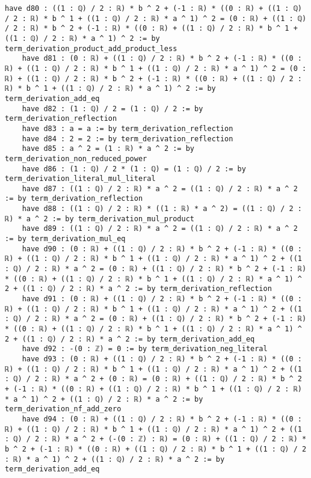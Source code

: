 \documentclass{article}
\begin{document}
\begin{tcolorbox}[colback=white!10, width=\linewidth]
\begin{lstlisting}[language=Lean4]
    have d80 : ((1 : ℚ) / 2 : ℝ) * b ^ 2 + (-1 : ℝ) * ((0 : ℝ) + ((1 : ℚ) / 2 : ℝ) * b ^ 1 + ((1 : ℚ) / 2 : ℝ) * a ^ 1) ^ 2 = (0 : ℝ) + ((1 : ℚ) / 2 : ℝ) * b ^ 2 + (-1 : ℝ) * ((0 : ℝ) + ((1 : ℚ) / 2 : ℝ) * b ^ 1 + ((1 : ℚ) / 2 : ℝ) * a ^ 1) ^ 2 := by term_derivation_product_add_product_less
    have d81 : (0 : ℝ) + ((1 : ℚ) / 2 : ℝ) * b ^ 2 + (-1 : ℝ) * ((0 : ℝ) + ((1 : ℚ) / 2 : ℝ) * b ^ 1 + ((1 : ℚ) / 2 : ℝ) * a ^ 1) ^ 2 = (0 : ℝ) + ((1 : ℚ) / 2 : ℝ) * b ^ 2 + (-1 : ℝ) * ((0 : ℝ) + ((1 : ℚ) / 2 : ℝ) * b ^ 1 + ((1 : ℚ) / 2 : ℝ) * a ^ 1) ^ 2 := by term_derivation_add_eq
    have d82 : (1 : ℚ) / 2 = (1 : ℚ) / 2 := by term_derivation_reflection
    have d83 : a = a := by term_derivation_reflection
    have d84 : 2 = 2 := by term_derivation_reflection
    have d85 : a ^ 2 = (1 : ℝ) * a ^ 2 := by term_derivation_non_reduced_power
    have d86 : (1 : ℚ) / 2 * (1 : ℚ) = (1 : ℚ) / 2 := by term_derivation_literal_mul_literal
    have d87 : ((1 : ℚ) / 2 : ℝ) * a ^ 2 = ((1 : ℚ) / 2 : ℝ) * a ^ 2 := by term_derivation_reflection
    have d88 : ((1 : ℚ) / 2 : ℝ) * ((1 : ℝ) * a ^ 2) = ((1 : ℚ) / 2 : ℝ) * a ^ 2 := by term_derivation_mul_product
    have d89 : ((1 : ℚ) / 2 : ℝ) * a ^ 2 = ((1 : ℚ) / 2 : ℝ) * a ^ 2 := by term_derivation_mul_eq
    have d90 : (0 : ℝ) + ((1 : ℚ) / 2 : ℝ) * b ^ 2 + (-1 : ℝ) * ((0 : ℝ) + ((1 : ℚ) / 2 : ℝ) * b ^ 1 + ((1 : ℚ) / 2 : ℝ) * a ^ 1) ^ 2 + ((1 : ℚ) / 2 : ℝ) * a ^ 2 = (0 : ℝ) + ((1 : ℚ) / 2 : ℝ) * b ^ 2 + (-1 : ℝ) * ((0 : ℝ) + ((1 : ℚ) / 2 : ℝ) * b ^ 1 + ((1 : ℚ) / 2 : ℝ) * a ^ 1) ^ 2 + ((1 : ℚ) / 2 : ℝ) * a ^ 2 := by term_derivation_reflection
    have d91 : (0 : ℝ) + ((1 : ℚ) / 2 : ℝ) * b ^ 2 + (-1 : ℝ) * ((0 : ℝ) + ((1 : ℚ) / 2 : ℝ) * b ^ 1 + ((1 : ℚ) / 2 : ℝ) * a ^ 1) ^ 2 + ((1 : ℚ) / 2 : ℝ) * a ^ 2 = (0 : ℝ) + ((1 : ℚ) / 2 : ℝ) * b ^ 2 + (-1 : ℝ) * ((0 : ℝ) + ((1 : ℚ) / 2 : ℝ) * b ^ 1 + ((1 : ℚ) / 2 : ℝ) * a ^ 1) ^ 2 + ((1 : ℚ) / 2 : ℝ) * a ^ 2 := by term_derivation_add_eq
    have d92 : -(0 : ℤ) = 0 := by term_derivation_neg_literal
    have d93 : (0 : ℝ) + ((1 : ℚ) / 2 : ℝ) * b ^ 2 + (-1 : ℝ) * ((0 : ℝ) + ((1 : ℚ) / 2 : ℝ) * b ^ 1 + ((1 : ℚ) / 2 : ℝ) * a ^ 1) ^ 2 + ((1 : ℚ) / 2 : ℝ) * a ^ 2 + (0 : ℝ) = (0 : ℝ) + ((1 : ℚ) / 2 : ℝ) * b ^ 2 + (-1 : ℝ) * ((0 : ℝ) + ((1 : ℚ) / 2 : ℝ) * b ^ 1 + ((1 : ℚ) / 2 : ℝ) * a ^ 1) ^ 2 + ((1 : ℚ) / 2 : ℝ) * a ^ 2 := by term_derivation_nf_add_zero
    have d94 : (0 : ℝ) + ((1 : ℚ) / 2 : ℝ) * b ^ 2 + (-1 : ℝ) * ((0 : ℝ) + ((1 : ℚ) / 2 : ℝ) * b ^ 1 + ((1 : ℚ) / 2 : ℝ) * a ^ 1) ^ 2 + ((1 : ℚ) / 2 : ℝ) * a ^ 2 + (-(0 : ℤ) : ℝ) = (0 : ℝ) + ((1 : ℚ) / 2 : ℝ) * b ^ 2 + (-1 : ℝ) * ((0 : ℝ) + ((1 : ℚ) / 2 : ℝ) * b ^ 1 + ((1 : ℚ) / 2 : ℝ) * a ^ 1) ^ 2 + ((1 : ℚ) / 2 : ℝ) * a ^ 2 := by term_derivation_add_eq

\end{lstlisting}
\end{tcolorbox}
\end{document}
